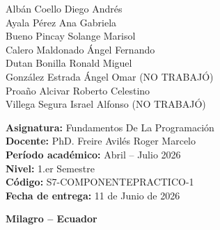 \documentclass[12pt,a4paper]{article}
\begin{document}
\begin{titlepage}
\begin{minipage}{0.95\textwidth}
		{\Large\color{azulUNEMI}
			\hspace*{1cm}Albán Coello Diego Andrés\\
			\hspace*{1cm}Ayala Pérez Ana Gabriela\\
			\hspace*{1cm}\color{azulUNEMI}Bueno Pincay Solange Marisol\\
			\hspace*{1cm}\color{azulUNEMI}Calero Maldonado Ángel Fernando\\
			\hspace*{1cm}\color{azulUNEMI}Dutan Bonilla Ronald Miguel\\
			\hspace*{1cm}\color{azulUNEMI}González Estrada Ángel Omar \color{red} (NO TRABAJÓ)\\
			\hspace*{1cm}\color{azulUNEMI}Proaño Alcivar Roberto Celestino\\
			\hspace*{1cm}\color{azulUNEMI}Villega Segura Israel Alfonso \color{red}(NO TRABAJÓ)}
		
		\vspace{1.2cm}
		
		{\Large\color{naranjaUNEMI}
			\textbf{Asignatura:}}
		{\Large\color{azulUNEMI} Fundamentos De La Programación}\\
		
		{\Large\color{naranjaUNEMI}
			\textbf{Docente:}}
		{\Large\color{azulUNEMI} PhD. Freire Avilés Roger Marcelo}\\
		
		{\Large\color{naranjaUNEMI}
			\textbf{Período académico:}}
		{\Large\color{azulUNEMI} Abril -- Julio 2026}\\
		
		{\Large\color{naranjaUNEMI}
			\textbf{Nivel:}}
		{\Large\color{azulUNEMI} 1.er Semestre}\\
		
		{\Large\color{naranjaUNEMI}
			\textbf{Código:}}
		{\Large\color{azulUNEMI} S7-COMPONENTEPRACTICO-1}\\
		
		{\Large\color{naranjaUNEMI}
			\textbf{Fecha de entrega:}}
		{\Large\color{azulUNEMI} 11 de Junio de 2026}
		
	\end{minipage}
	
	\vfill
	
	{\large
		\color{azulUNEMI}
		\textbf{Milagro -- Ecuador}\par}
	
\end{titlepage}
\end{document}
